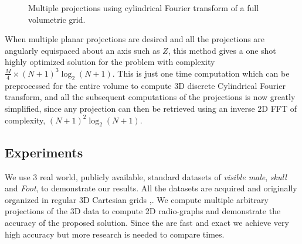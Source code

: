 \documentclass{UCF_ETD}
\begin{document}
\begin{figure}[H]
\begin{center}
\caption{Multiple projections using cylindrical Fourier transform of a full volumetric grid.}
\label{CylindricalCoordinatesTransform.fig}
\end{center}
\end{figure}


When multiple planar projections are desired and all the projections are angularly equispaced about an axis such as $Z$, this method gives a one shot highly optimized solution for the problem with complexity $\frac{M}{4} \times (N+1)^3 \log_2(N+1)$. This is just one time computation which can be preprocessed for the entire volume to compute 3D discrete Cylindrical Fourier transform, and all the subsequent computations of the projections is now greatly simplified, since any projection can then be retrieved using an inverse $2$D FFT of complexity, $(N+1)^2 \log_2 (N+1)$. 

\subsection{Experiments}
We use $3$ real world, publicly available, standard datasets of \emph{visible male}, \emph{skull} and \emph{Foot}, to demonstrate our results.  All the datasets are acquired and originally organized in regular 3D Cartesian grids \cite{OnlineLib1},\cite{OnlineLib2}. 
We compute multiple arbitrary projections of the 3D data to compute 2D radio-graphs and demonstrate the accuracy of the proposed solution. Since the are fast and exact we achieve very high accuracy but more research is needed to compare times. 
\end{document}
